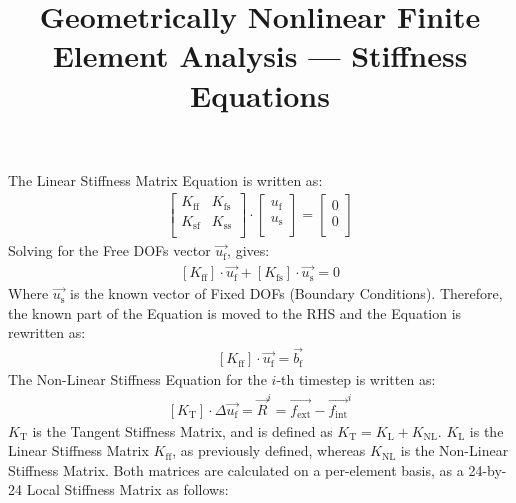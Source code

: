 \documentclass{article}
\begin{document}

\title{Geometrically Nonlinear Finite Element Analysis --- Stiffness Equations}
\date{}
\maketitle

\noindent The Linear Stiffness Matrix Equation is written as:
\begin{align}
    \left[
        \begin{array}{c|c}
            K_{\text{ff}} & K_{\text{fs}} \\
            \hline
            K_{\text{sf}} & K_{\text{ss}} \\
        \end{array}
        \right]
    \cdot
    \left[
        \begin{array}{c}
            u_{\text{f}} \\
            \hline
            u_{\text{s}} \\
        \end{array}
        \right]
    = \left[
        \begin{array}{c}
            0 \\
            \hline
            0 \\
        \end{array}
        \right]
    \nonumber
\end{align}
Solving for the Free DOFs vector $\vec{u_{\text{f}}}$, gives:
\begin{align}
    \left[K_{\text{ff}}\right]\cdot \vec{u_{\text{f}}}
    + \left[K_{\text{fs}}\right]\cdot \vec{u_{\text{s}}} = 0
    \nonumber
\end{align}
Where $\vec{u_{\text{s}}}$ is the known vector of Fixed DOFs (Boundary Conditions). Therefore, the known part of the Equation is moved to the RHS and the Equation is rewritten as:
\begin{align}
    \left[K_{\text{ff}}\right]\cdot \vec{u_{\text{f}}} = \vec{b_{\text{f}}}
    \nonumber
\end{align}
The Non-Linear Stiffness Equation for the $i$-th timestep is written as:
\begin{align}
    \left[K_{\text{T}}\right]\cdot \Delta\vec{u_{\text{f}}} = \vec{R}^i = \vec{f_{\text{ext}}} - \vec{f_{\text{int}}}^i
    \nonumber
\end{align}
$K_{\text{T}}$ is the Tangent Stiffness Matrix, and is defined as $K_{\text{T}}=K_{\text{L}}+K_{\text{NL}}$. $K_{\text{L}}$ is the Linear Stiffness Matrix $K_{\text{ff}}$, as previously defined, whereas $K_{\text{NL}}$ is the Non-Linear Stiffness Matrix. Both matrices are calculated on a per-element basis, as a 24-by-24 Local Stiffness Matrix as follows:
\end{document}
